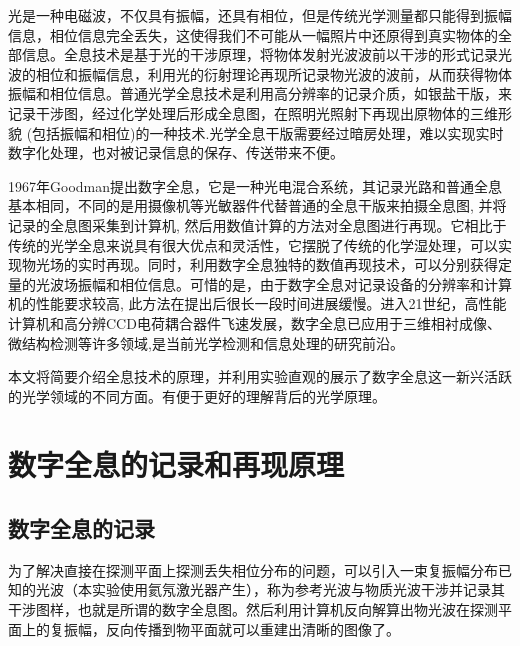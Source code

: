 \documentclass{WHUReport}
\begin{document}
\begin{multicols}{2}
	光是一种电磁波，不仅具有振幅，还具有相位，但是传统光学测量都只能得到振幅信息，相位信息完全丢失，这使得我们不可能从一幅照片中还原得到真实物体的全部信息。全息技术是基于光的干涉原理，将物体发射光波波前以干涉的形式记录光波的相位和振幅信息，利用光的衍射理论再现所记录物光波的波前，从而获得物体振幅和相位信息。普通光学全息技术是利用高分辨率的记录介质，如银盐干版，来记录干涉图，经过化学处理后形成全息图，在照明光照射下再现出原物体的三维形貌 (包括振幅和相位)的一种技术.光学全息干版需要经过暗房处理，难以实现实时数字化处理，也对被记录信息的保存、传送带来不便。
	
	1967年Goodman提出数字全息，它是一种光电混合系统，其记录光路和普通全息基本相同，不同的是用摄像机等光敏器件代替普通的全息干版来拍摄全息图, 并将记录的全息图采集到计算机, 然后用数值计算的方法对全息图进行再现。它相比于传统的光学全息来说具有很大优点和灵活性，它摆脱了传统的化学湿处理，可以实现物光场的实时再现。同时，利用数字全息独特的数值再现技术，可以分别获得定量的光波场振幅和相位信息。可惜的是，由于数字全息对记录设备的分辨率和计算机的性能要求较高, 此方法在提出后很长一段时间进展缓慢。进入21世纪，高性能计算机和高分辨CCD电荷耦合器件飞速发展，数字全息已应用于三维相衬成像、微结构检测等许多领域,是当前光学检测和信息处理的研究前沿。
	
	本文将简要介绍全息技术的原理，并利用实验直观的展示了数字全息这一新兴活跃的光学领域的不同方面。有便于更好的理解背后的光学原理。
	\section{数字全息的记录和再现原理}
	\subsection{数字全息的记录}
	为了解决直接在探测平面上探测丢失相位分布的问题，可以引入一束复振幅分布已知的光波（本实验使用氦氖激光器产生），称为参考光波与物质光波干涉并记录其干涉图样，也就是所谓的数字全息图。然后利用计算机反向解算出物光波在探测平面上的复振幅，反向传播到物平面就可以重建出清晰的图像了。
	

\end{multicols}
\end{document}
